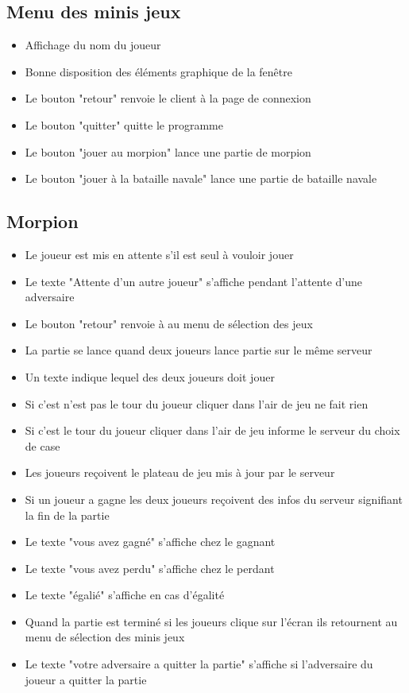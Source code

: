 \documentclass{report}
\begin{document}
\subsection{Menu des minis jeux}
\begin{itemize}
  \item Affichage du nom du joueur
  \item Bonne disposition des éléments graphique de la fenêtre
  \item Le bouton "retour" renvoie le client à la page de connexion
  \item Le bouton "quitter" quitte le programme
  \item Le bouton "jouer au morpion" lance une partie de morpion
  \item Le bouton "jouer à la bataille navale" lance une partie de bataille navale
\end{itemize}

\subsection{Morpion}
\begin{itemize}
  \item Le joueur est mis en attente s'il est seul à vouloir jouer
  \item Le texte "Attente d'un autre joueur" s'affiche pendant l'attente d'une adversaire
  \item Le bouton "retour" renvoie à au menu de sélection des jeux
  \item La partie se lance quand deux joueurs lance partie sur le même serveur
  \item Un texte indique lequel des deux joueurs doit jouer
  \item Si c'est n'est pas le tour du joueur cliquer dans l'air de jeu ne fait rien
  \item Si c'est le tour du joueur cliquer dans l'air de jeu informe le serveur du choix de case
  \item Les joueurs reçoivent le plateau de jeu mis à jour par le serveur
  \item Si un joueur a gagne les deux joueurs reçoivent des infos du serveur signifiant la fin de la partie
  \item Le texte "vous avez gagné" s'affiche chez le gagnant
  \item Le texte "vous avez perdu" s'affiche chez le perdant
  \item Le texte "égalié" s'affiche en cas d'égalité
  \item Quand la partie est terminé si les joueurs clique sur l'écran ils retournent au menu de sélection des minis jeux
  \item Le texte "votre adversaire a quitter la partie" s'affiche si l'adversaire du joueur a quitter la partie
\end{itemize}
\end{document}
